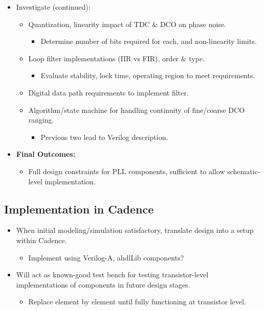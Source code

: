 \documentclass[10pt,a4paper]{article}
\begin{document}
		\begin{itemize}
			\footnotesize
			\item Investigate (continued):
			\begin{itemize}
				\footnotesize
				\item Quantization, linearity impact of TDC \& DCO on phase noise.
				\begin{itemize}
					\scriptsize
					\item Determine number of bits required for each, and non-linearity limits.  
				\end{itemize}
				\item Loop filter implementations (IIR vs FIR), order \& type.
				\begin{itemize}
					\scriptsize
					\item Evaluate stability, lock time, operating region to meet requirements. 
				\end{itemize}
				\item Digital data path requirements to implement filter.
				\item Algorithm/state machine for handling continuity of fine/coarse DCO ranging. 
				\begin{itemize}
					\scriptsize
					\item Previous two lead to Verilog description.  
				\end{itemize}
			\end{itemize}
			\item \textbf{Final Outcomes:}
			\begin{itemize}
				\footnotesize
				\item Full design constraints for PLL components, sufficient to allow schematic-level implementation.
			\end{itemize}
		\end{itemize}    

		\subsection{Implementation in Cadence}
		\vspace{-.2em}
		\begin{itemize}
			\footnotesize
			\item When initial modeling/simulation satisfactory, translate design into a setup within Cadence.
			\begin{itemize}
				\footnotesize
				\item Implement using Verilog-A, ahdlLib components?
			\end{itemize}
			\footnotesize
			\item Will act as known-good test bench for testing transistor-level implementations of components in future design stages.
			\begin{itemize}
				\footnotesize
				\item Replace element by element until fully functioning at transistor level.
			\end{itemize}
		\end{itemize}    
\end{document}
